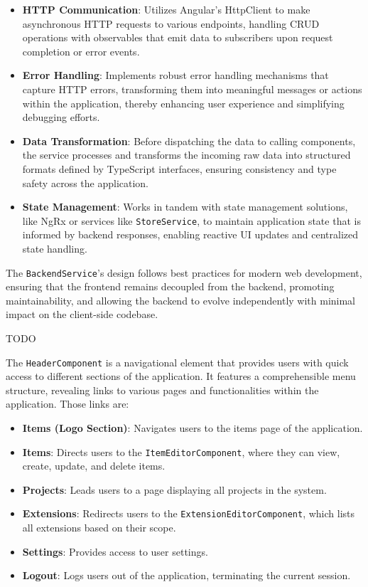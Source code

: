 \begin{itemize}
    \item \textbf{HTTP Communication}: Utilizes Angular's HttpClient to make asynchronous HTTP requests to various endpoints, handling CRUD operations with observables that emit data to subscribers upon request completion or error events.
    \item \textbf{Error Handling}: Implements robust error handling mechanisms that capture HTTP errors, transforming them into meaningful messages or actions within the application, thereby enhancing user experience and simplifying debugging efforts.
    \item \textbf{Data Transformation}: Before dispatching the data to calling components, the service processes and transforms the incoming raw data into structured formats defined by TypeScript interfaces, ensuring consistency and type safety across the application.
    \item \textbf{State Management}: Works in tandem with state management solutions, like NgRx or services like \texttt{StoreService}, to maintain application state that is informed by backend responses, enabling reactive UI updates and centralized state handling.
\end{itemize}

The \texttt{BackendService}'s design follows best practices for modern web development, ensuring that the frontend remains decoupled from the backend, promoting maintainability, and allowing the backend to evolve independently with minimal impact on the client-side codebase.

TODO

The \texttt{HeaderComponent} is a navigational element that provides users with quick access to different sections of the application.
It features a comprehensible menu structure, revealing links to various pages and functionalities within the application.
Those links are:

\begin{itemize}
    \item \textbf{Items (Logo Section)}: Navigates users to the items page of the application.
    \item \textbf{Items}: Directs users to the \texttt{ItemEditorComponent}, where they can view, create, update, and delete items.
    \item \textbf{Projects}: Leads users to a page displaying all projects in the system.
    \item \textbf{Extensions}: Redirects users to the \texttt{ExtensionEditorComponent}, which lists all extensions based on their scope.
    \item \textbf{Settings}: Provides access to user settings.
    \item \textbf{Logout}: Logs users out of the application, terminating the current session.
\end{itemize}

